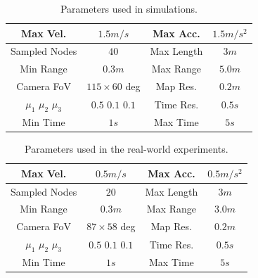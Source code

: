{
\renewcommand{\arraystretch}{1.35}
\begin{table}[b!]
    \centering
    \begin{tabular}{||c|c||c|c||}
        \hline
        \hline
        Max Vel. & $1.5 m/s$ & Max Acc. & $1.5 m/s^2$ \\
        \hline
        Sampled Nodes & $40$ & Max Length & $3 m$ \\
        \hline
        Min Range & $0.3 m$ & Max Range & $5.0 m$ \\
        \hline
        Camera FoV & $115\times60$ deg & Map Res. & $0.2 m$ \\
        \hline
        $\mu_1$ $\mu_2$ $\mu_3$ & $0.5$ $0.1$ $0.1$ & Time Res. & $0.5 s$ \\
        \hline
        Min Time & $1s$ & Max Time & $5s$ \\
        \hline
        \hline
    \end{tabular}
    \caption{Parameters used in simulations.}%
	\label{TAB:EXPLORATION-SIMULATION-PARAMETERS}
\end{table}
\begin{table}[b!]
    \centering
    \begin{tabular}{||c|c||c|c||}
        \hline
        \hline
        Max Vel. & $0.5 m/s$ & Max Acc. & $0.5 m/s^2$ \\
        \hline
        Sampled Nodes & $20$ & Max Length & $3 m$\\
        \hline
        Min Range & $0.3 m$ & Max Range & $3.0 m$ \\
        \hline
        Camera FoV & $87\times58$ deg & Map Res. & $0.2 m$ \\
        \hline
        $\mu_1$ $\mu_2$ $\mu_3$ & $0.5$ $0.1$ $0.1$ & Time Res. & $0.5 s$ \\
        \hline
        Min Time & $1s$ & Max Time & $5s$ \\
        \hline
        \hline
    \end{tabular}
    \caption{Parameters used in the real-world experiments.}%
	\label{TAB:EXPLORATION-REAL-PARAMETERS}
\end{table}
}
